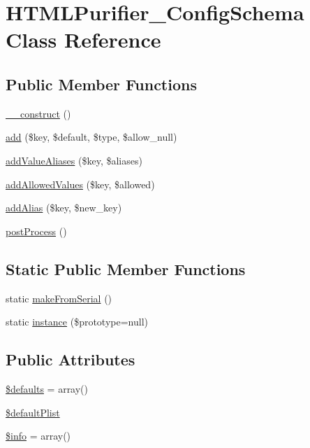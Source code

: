 \hypertarget{classHTMLPurifier__ConfigSchema}{\section{H\+T\+M\+L\+Purifier\+\_\+\+Config\+Schema Class Reference}
\label{classHTMLPurifier__ConfigSchema}
}
\subsection*{Public Member Functions}
\begin{DoxyCompactItemize}
\item 
\hyperlink{classHTMLPurifier__ConfigSchema_a41e23be9cf4cd46902c8a2b28db9622c}{\+\_\+\+\_\+construct} ()
\item 
\hyperlink{classHTMLPurifier__ConfigSchema_a951740a9c5af8e60ef42ba8dee66fe4e}{add} (\$key, \$default, \$type, \$allow\+\_\+null)
\item 
\hyperlink{classHTMLPurifier__ConfigSchema_a0dd75c50a43c7a694630eea4ee4c2062}{add\+Value\+Aliases} (\$key, \$aliases)
\item 
\hyperlink{classHTMLPurifier__ConfigSchema_a30ba02af1d480d033c8ccc6b4bf1e4e9}{add\+Allowed\+Values} (\$key, \$allowed)
\item 
\hyperlink{classHTMLPurifier__ConfigSchema_a4ef5fe568294717b9751e76e6d5da39d}{add\+Alias} (\$key, \$new\+\_\+key)
\item 
\hyperlink{classHTMLPurifier__ConfigSchema_a72f7e0607e67dbed7697caa8c40bdcf9}{post\+Process} ()
\end{DoxyCompactItemize}
\subsection*{Static Public Member Functions}
\begin{DoxyCompactItemize}
\item 
static \hyperlink{classHTMLPurifier__ConfigSchema_ade90aaacf1175ee0834258d872de751d}{make\+From\+Serial} ()
\item 
static \hyperlink{classHTMLPurifier__ConfigSchema_a08032256a2747722b8d04ba5354fde1d}{instance} (\$prototype=null)
\end{DoxyCompactItemize}
\subsection*{Public Attributes}
\begin{DoxyCompactItemize}
\item 
\hyperlink{classHTMLPurifier__ConfigSchema_a7fc713e221224772229688e8bda11a19}{\$defaults} = array()
\item 
\hyperlink{classHTMLPurifier__ConfigSchema_a05712519dc257a092bc9bda8bfe34977}{\$default\+Plist}
\item 
\hyperlink{classHTMLPurifier__ConfigSchema_a2e8a80a7aa2d777b95de55e8465d385b}{\$info} = array()
\end{DoxyCompactItemize}
